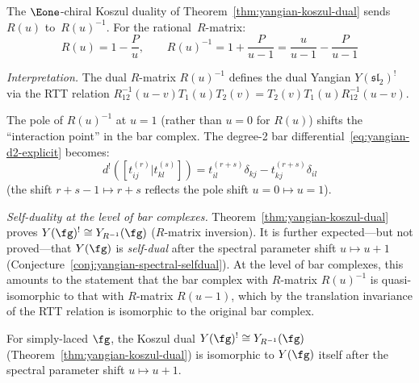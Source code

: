 \begin{computation}
\label{comp:yangian-dual-explicit}

The $\Eone$-chiral Koszul duality of
Theorem~\ref{thm:yangian-koszul-dual}
sends $R(u)$ to~$R(u)^{-1}$.
For the rational~$R$-matrix:
\[
R(u) = 1 - \frac{P}{u}, \qquad
R(u)^{-1} = 1 + \frac{P}{u - 1}
= \frac{u}{u-1} - \frac{P}{u-1}
\]

\emph{Interpretation.}
The dual $R$-matrix $R(u)^{-1}$ defines the dual Yangian
$Y(\mathfrak{sl}_2)^!$ via the RTT relation
$R^{-1}_{12}(u-v) T_1(u) T_2(v)
= T_2(v) T_1(u) R^{-1}_{12}(u-v)$.

The pole of $R(u)^{-1}$ at $u = 1$ (rather than $u = 0$
for $R(u)$) shifts the ``interaction point'' in the bar complex.
The degree-2 bar differential~\eqref{eq:yangian-d2-explicit}
becomes:
\[
d^!([t_{ij}^{(r)} | t_{kl}^{(s)}])
= t_{il}^{(r+s)} \delta_{kj} - t_{kj}^{(r+s)} \delta_{il}
\]
(the shift $r+s-1 \mapsto r+s$ reflects the pole shift
$u = 0 \mapsto u = 1$).

\emph{Self-duality at the level of bar complexes.}
Theorem~\ref{thm:yangian-koszul-dual} proves $Y(\fg)^! \cong Y_{R^{-1}}(\fg)$
($R$-matrix inversion).  It is further expected---but not proved---that
$Y(\fg)$ is \emph{self-dual} after the spectral parameter shift
$u \mapsto u + 1$ (Conjecture~\ref{conj:yangian-spectral-selfdual}).
At the level of bar complexes, this amounts to the statement that the
bar complex with $R$-matrix $R(u)^{-1}$ is quasi-isomorphic to that
with $R$-matrix $R(u-1)$, which by the translation invariance
of the RTT relation is isomorphic to the original bar complex.

\begin{conjecture}\label{conj:yangian-spectral-selfdual}
For simply-laced $\fg$, the Koszul dual $Y(\fg)^! \cong Y_{R^{-1}}(\fg)$
\textup{(}Theorem~\textup{\ref{thm:yangian-koszul-dual}}\textup{)} is
isomorphic to $Y(\fg)$ itself after the spectral parameter shift
$u \mapsto u + 1$.
\end{conjecture}

\end{computation}

